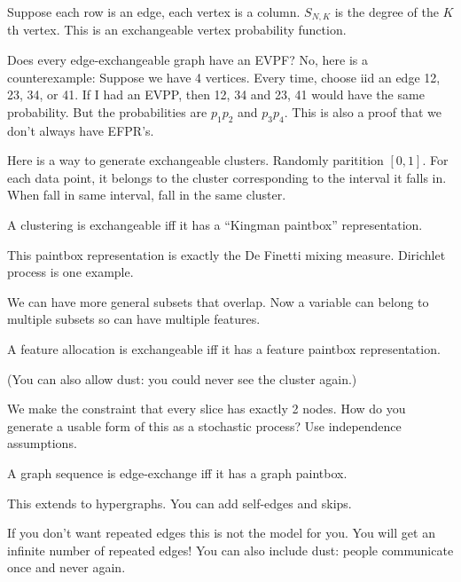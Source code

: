Suppose each row is an edge, each vertex is a column. $S_{N,K}$ is the degree of the $K$th vertex.  %
This is an exchangeable vertex probability function.

Does every edge-exchangeable graph have an EVPF? No, here is a counterexample: Suppose we have 4 vertices. Every time, choose iid an edge 12, 23, 34, or 41. If I had an EVPP, then 12, 34 and 23, 41 would have the same probability. But the probabilities are $p_1p_2$ and $p_3p_4$. 
This is also a proof that we don't always have EFPR's.


Here is a way to generate exchangeable clusters. Randomly paritition $[0,1]$. For each data point, it belongs to the cluster corresponding to the interval it falls in. When fall in same interval, fall in the same cluster.

\begin{thm}[Kingman]
A clustering is exchangeable iff it has a ``Kingman paintbox'' representation.
\end{thm}
This paintbox representation is exactly the De Finetti mixing measure.
Dirichlet process is one example.

We can have more general subsets that overlap. Now a variable can belong to multiple subsets so can have multiple features.

\begin{thm}
A feature allocation is exchangeable iff it has a feature paintbox representation. 
\end{thm}
(You can also allow dust: you could never see the cluster again.)

We make the constraint that every slice has exactly 2 nodes.
How do you generate a usable form of this as a stochastic process? Use independence assumptions.
\begin{thm}
A graph sequence is edge-exchange iff it has a graph paintbox.
\end{thm}
This extends to hypergraphs. You can add self-edges and skips.

If you don't want repeated edges this is not the model for you. You will get an infinite number of repeated edges!
You can also include dust: people communicate once and never again. %

